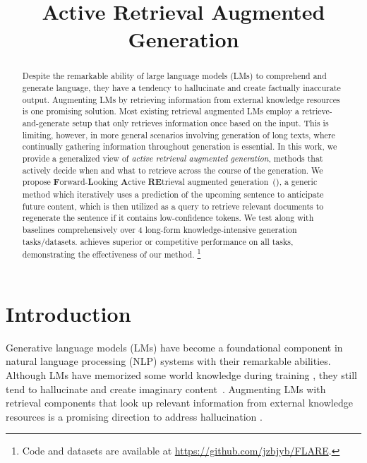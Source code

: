 \title{Active Retrieval Augmented Generation}



\maketitle
\begin{abstract}
Despite the remarkable ability of large language models (LMs) to comprehend and generate language, they have a tendency to hallucinate and create factually inaccurate output.
Augmenting LMs by retrieving information from external knowledge resources is one promising solution.
Most existing retrieval augmented LMs employ a retrieve-and-generate setup that only retrieves information once based on the input.
This is limiting, however, in more general scenarios involving generation of long texts, where continually gathering information throughout generation is essential.
In this work, we provide a generalized view of \emph{active retrieval augmented generation}, methods that actively decide when and what to retrieve across the course of the generation.
We propose \textbf{F}orward-\textbf{L}ooking \textbf{A}ctive \textbf{RE}trieval augmented generation~(\textbf{\ours}), a generic method which iteratively uses a prediction of the upcoming sentence to anticipate future content, which is then utilized as a query to retrieve relevant documents to regenerate the sentence if it contains low-confidence tokens.
We test \ours along with baselines comprehensively over 4 long-form knowledge-intensive generation tasks/datasets.
\ours achieves superior or competitive performance on all tasks, demonstrating the effectiveness of our method.%
\footnote{Code and datasets are available at \url{https://github.com/jzbjyb/FLARE}.}
\end{abstract}

\section{Introduction}

Generative language models (LMs) \cite{gpt3-brown-2020,instructgpt3-ouyang-2022,gpt4-2023,palm-chowdhery-2022,opt-zhang-2022,llama-touvron-2023,zhao-llm-2023} have become a foundational component in natural language processing (NLP) systems with their remarkable abilities.
Although LMs have memorized some world knowledge during training \cite{lama-petroni-2019,t5pack-roberts-2020,lpaqa-jiang-2020}, they still tend to hallucinate and create imaginary content~\cite{maynez-etal-2020-faithfulness,zhou-etal-2021-detecting}.
Augmenting LMs with retrieval components that look up relevant information from external knowledge resources is a promising direction to address hallucination \cite{knnlm-2020-khandelwal,atlas-izacard-2022}.

